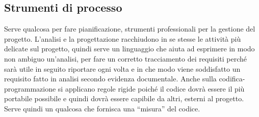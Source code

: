 \subsection{Strumenti di processo}
Serve qualcosa per fare pianificazione, strumenti professionali per la gestione del progetto. 
L'analisi e la progettazione racchiudono in se stesse le attività più delicate sul progetto, quindi serve un linguaggio che aiuta ad esprimere in modo non ambiguo un'analisi, per fare un corretto tracciamento dei requisiti perché sarà utile in seguito riportare ogni volta e in che modo viene soddisfatto un requisito fatto in analisi secondo evidenza documentale.
Anche sulla codifica-programmazione si applicano regole rigide poiché il codice dovrà essere il più portabile possibile e quindi dovrà essere capibile da altri, esterni al progetto. 
Serve quindi un qualcosa che fornisca una ``misura'' del codice.

